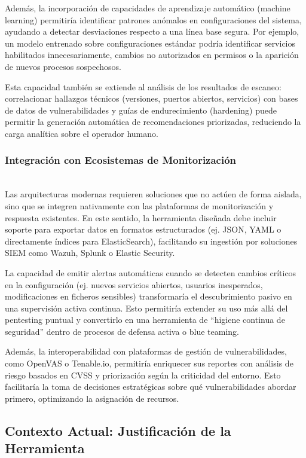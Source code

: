 \documentclass[runningheads]{llncs}
\begin{document}
Además, la incorporación de capacidades de aprendizaje automático (machine learning) permitiría identificar patrones anómalos en configuraciones del sistema, ayudando a detectar desviaciones respecto a una línea base segura. Por ejemplo, un modelo entrenado sobre configuraciones estándar podría identificar servicios habilitados innecesariamente, cambios no autorizados en permisos o la aparición de nuevos procesos sospechosos.

Esta capacidad también se extiende al análisis de los resultados de escaneo: correlacionar hallazgos técnicos (versiones, puertos abiertos, servicios) con bases de datos de vulnerabilidades y guías de endurecimiento (hardening) puede permitir la generación automática de recomendaciones priorizadas, reduciendo la carga analítica sobre el operador humano.

\subsubsection{Integración con Ecosistemas de Monitorización}
\hfill\\

Las arquitecturas modernas requieren soluciones que no actúen de forma aislada, sino que se integren nativamente con las plataformas de monitorización y respuesta existentes. En este sentido, la herramienta diseñada debe incluir soporte para exportar datos en formatos estructurados (ej. JSON, YAML o directamente índices para ElasticSearch), facilitando su ingestión por soluciones SIEM como Wazuh, Splunk o Elastic Security.

La capacidad de emitir alertas automáticas cuando se detecten cambios críticos en la configuración (ej. nuevos servicios abiertos, usuarios inesperados, modificaciones en ficheros sensibles) transformaría el descubrimiento pasivo en una supervisión activa continua. Esto permitiría extender su uso más allá del pentesting puntual y convertirlo en una herramienta de “higiene continua de seguridad” dentro de procesos de defensa activa o blue teaming.

Además, la interoperabilidad con plataformas de gestión de vulnerabilidades, como OpenVAS o Tenable.io, permitiría enriquecer sus reportes con análisis de riesgo basados en CVSS y priorización según la criticidad del entorno. Esto facilitaría la toma de decisiones estratégicas sobre qué vulnerabilidades abordar primero, optimizando la asignación de recursos.

\subsection{Contexto Actual: Justificación de la Herramienta}
\end{document}
